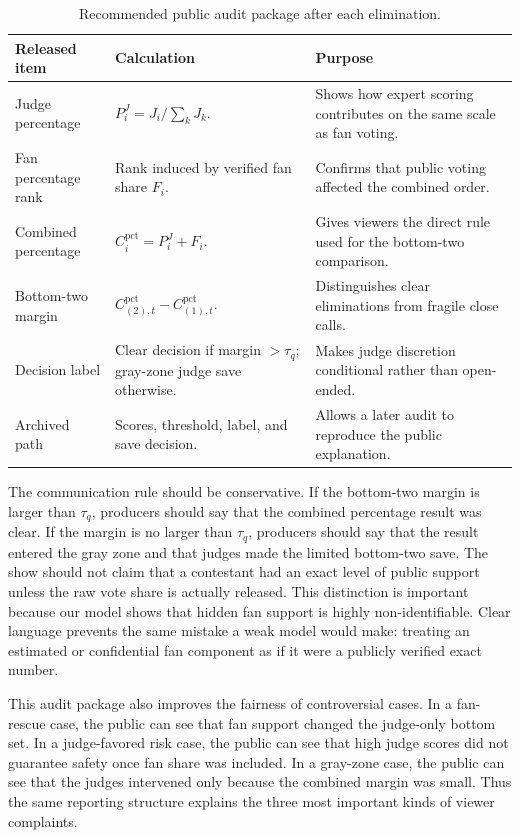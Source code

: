 \documentclass[12pt]{article}
\begin{document}
\begin{table}[!htbp]
  \centering
  \caption{Recommended public audit package after each elimination.}
  \label{tab:audit-package}
  \begin{tabularx}{0.98\linewidth}{lXX}
    \toprule
    Released item & Calculation & Purpose \\
    \midrule
    Judge percentage & $P_i^J=J_i/\sum_kJ_k$. & Shows how expert scoring
    contributes on the same scale as fan voting. \\
    Fan percentage rank & Rank induced by verified fan share $F_i$. & Confirms
    that public voting affected the combined order. \\
    Combined percentage & $C_i^{\mathrm{pct}}=P_i^J+F_i$. & Gives viewers the
    direct rule used for the bottom-two comparison. \\
    Bottom-two margin & $C^{\mathrm{pct}}_{(2),t}-C^{\mathrm{pct}}_{(1),t}$. &
    Distinguishes clear eliminations from fragile close calls. \\
    Decision label & Clear decision if margin $>\tau_q$; gray-zone judge save
    otherwise. & Makes judge discretion conditional rather than open-ended. \\
    Archived path & Scores, threshold, label, and save decision. & Allows a
    later audit to reproduce the public explanation. \\
    \bottomrule
  \end{tabularx}
\end{table}

The communication rule should be conservative. If the bottom-two margin is
larger than $\tau_q$, producers should say that the combined percentage result
was clear. If the margin is no larger than $\tau_q$, producers should say that
the result entered the gray zone and that judges made the limited bottom-two
save. The show should not claim that a contestant had an exact level of public
support unless the raw vote share is actually released. This distinction is
important because our model shows that hidden fan support is highly
non-identifiable. Clear language prevents the same mistake a weak model would
make: treating an estimated or confidential fan component as if it were a
publicly verified exact number.

This audit package also improves the fairness of controversial cases. In a
fan-rescue case, the public can see that fan support changed the judge-only
bottom set. In a judge-favored risk case, the public can see that high judge
scores did not guarantee safety once fan share was included. In a gray-zone
case, the public can see that the judges intervened only because the combined
margin was small. Thus the same reporting structure explains the three most
important kinds of viewer complaints.
\end{document}
